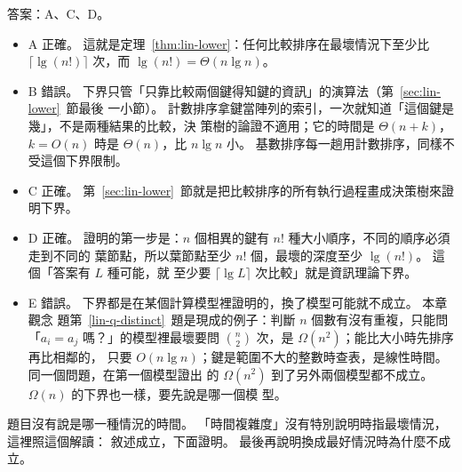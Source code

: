 答案：A、C、D。
\begin{itemize}
\item A 正確。 這就是定理~\ref{thm:lin-lower}：任何比較排序在最壞情況下至少比
$\lceil \lg(n!) \rceil$ 次，而 $\lg(n!) = \Theta(n \lg n)$。
\item B 錯誤。 下界只管「只靠比較兩個鍵得知鍵的資訊」的演算法（第~\ref{sec:lin-lower}~節最後
一小節）。 計數排序拿鍵當陣列的索引，一次就知道「這個鍵是幾」，不是兩種結果的比較，決
策樹的論證不適用；它的時間是 $\Theta(n + k)$，$k = O(n)$ 時是 $\Theta(n)$，比 $n \lg n$
小。 基數排序每一趟用計數排序，同樣不受這個下界限制。
\item C 正確。 第~\ref{sec:lin-lower}~節就是把比較排序的所有執行過程畫成決策樹來證明下界。
\item D 正確。 證明的第一步是：$n$ 個相異的鍵有 $n!$ 種大小順序，不同的順序必須走到不同的
葉節點，所以葉節點至少 $n!$ 個，最壞的深度至少 $\lg(n!)$。 這個「答案有 $L$ 種可能，就
至少要 $\lceil \lg L \rceil$ 次比較」就是資訊理論下界。
\item E 錯誤。 下界都是在某個計算模型裡證明的，換了模型可能就不成立。 本章觀念
題第~\ref{lin-q-distinct}~題是現成的例子：判斷 $n$ 個數有沒有重複，只能問「$a_i = a_j$
嗎？」的模型裡最壞要問 $\binom{n}{2}$ 次，是 $\Omega(n^2)$；能比大小時先排序再比相鄰的，
只要 $O(n \lg n)$；鍵是範圍不大的整數時查表，是線性時間。 同一個問題，在第一個模型證出
的 $\Omega(n^2)$ 到了另外兩個模型都不成立。 $\Omega(n)$ 的下界也一樣，要先說是哪一個模
型。
\end{itemize}

題目沒有說是哪一種情況的時間。 「時間複雜度」沒有特別說明時指最壞情況，這裡照這個解讀：
敘述成立，下面證明。 最後再說明換成最好情況時為什麼不成立。

